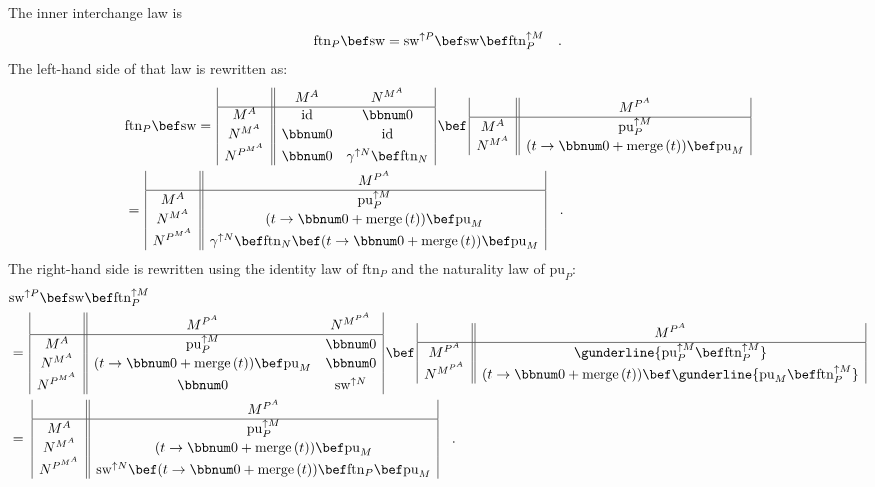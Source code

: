 The inner interchange law is
\[
\text{ftn}_{P}\bef\text{sw}=\text{sw}^{\uparrow P}\bef\text{sw}\bef\text{ftn}_{P}^{\uparrow M}\quad.
\]
The left-hand side of that law is rewritten as:
\begin{align*}
 & \text{ftn}_{P}\bef\text{sw}=\,\begin{array}{|c||cc|}
 & M^{A} & N^{M^{A}}\\
\hline M^{A} & \text{id} & \bbnum 0\\
N^{M^{A}} & \bbnum 0 & \text{id}\\
N^{P^{M^{A}}} & \bbnum 0 & \gamma^{\uparrow N}\bef\text{ftn}_{N}
\end{array}\,\bef\,\begin{array}{|c||c|}
 & M^{P^{A}}\\
\hline M^{A} & \text{pu}_{P}^{\uparrow M}\\
N^{M^{A}} & (t\rightarrow\bbnum 0+\text{merge}\,(t))\bef\text{pu}_{M}
\end{array}\\
 & =\,\begin{array}{|c||c|}
 & M^{P^{A}}\\
\hline M^{A} & \text{pu}_{P}^{\uparrow M}\\
N^{M^{A}} & (t\rightarrow\bbnum 0+\text{merge}\,(t))\bef\text{pu}_{M}\\
N^{P^{M^{A}}} & \gamma^{\uparrow N}\bef\text{ftn}_{N}\bef(t\rightarrow\bbnum 0+\text{merge}\,(t))\bef\text{pu}_{M}
\end{array}\quad.
\end{align*}
The right-hand side is rewritten using the identity law of $\text{ftn}_{P}$
and the naturality law of $\text{pu}_{P}$:
\begin{align*}
 & \text{sw}^{\uparrow P}\bef\text{sw}\bef\text{ftn}_{P}^{\uparrow M}\\
 & =\,\begin{array}{|c||cc|}
 & M^{P^{A}} & N^{M^{P^{A}}}\\
\hline M^{A} & \text{pu}_{P}^{\uparrow M} & \bbnum 0\\
N^{M^{A}} & (t\rightarrow\bbnum 0+\text{merge}\,(t))\bef\text{pu}_{M} & \bbnum 0\\
N^{P^{M^{A}}} & \bbnum 0 & \text{sw}^{\uparrow N}
\end{array}\,\bef\,\begin{array}{|c||c|}
 & M^{P^{A}}\\
\hline M^{P^{A}} & \gunderline{\text{pu}_{P}^{\uparrow M}\bef\text{ftn}_{P}^{\uparrow M}}\\
N^{M^{P^{A}}} & (t\rightarrow\bbnum 0+\text{merge}\,(t))\bef\gunderline{\text{pu}_{M}\bef\text{ftn}_{P}^{\uparrow M}}
\end{array}\\
 & =\,\,\begin{array}{|c||c|}
 & M^{P^{A}}\\
\hline M^{A} & \text{pu}_{P}^{\uparrow M}\\
N^{M^{A}} & (t\rightarrow\bbnum 0+\text{merge}\,(t))\bef\text{pu}_{M}\\
N^{P^{M^{A}}} & \text{sw}^{\uparrow N}\bef(t\rightarrow\bbnum 0+\text{merge}\,(t))\bef\text{ftn}_{P}\bef\text{pu}_{M}
\end{array}\quad.
\end{align*}
